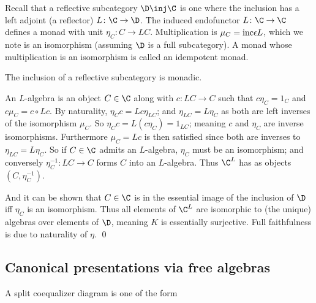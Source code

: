 \edefn

Recall that a reflective subcategory $\D\inj\C$ is one where the inclusion has a left adjoint (a {\emphcolor reflector}) $L\colon\C\to\D$.
The induced endofunctor $L\colon\C\to\C$ defines a monad with unit $\eta_C\colon C\to LC$.
Multiplication is $\mu_C={\rm inc}\epsilon L$, which we note is an isomorphism (assuming $\D$ is a full subcategory).
A monad whose multiplication is an isomorphism is called an {\emphcolor idempotent monad}.

\bprop

    The inclusion of a reflective subcategory is monadic.

\eprop

\bproof

    An $L$-algebra is an object $C\in\C$ along with $c\colon LC\to C$ such that $c\eta_C=1_C$ and $c\mu_C=c\circ Lc$.
    By naturality, $\eta_Cc=Lc\eta_{LC}$; and $\eta_{LC}=L\eta_C$ as both are left inverses of the isomorphism $\mu_C$.
    So $\eta_Cc=L(c\eta_C)=1_{LC}$; meaning $c$ and $\eta_C$ are inverse isomorphisms.
    Furthermore $\mu_C=Lc$ is then satisfied since both are inverses to $\eta_{LC}=L\eta_C$.
    So if $C\in\C$ admits an $L$-algebra, $\eta_C$ must be an isomorphism; and conversely $\eta_C^{-1}\colon LC\to C$ forms $C$ into an $L$-algebra.
    Thus $\C^L$ has as objects $(C,\eta_C^{-1})$.

    And it can be shown that $C\in\C$ is in the essential image of the inclusion of $\D$ iff $\eta_C$ is an isomorphism.
    Thus all elements of $\C^L$ are isomorphic to (the unique) algebras over elements of $\D$, meaning $K$ is essentially surjective.
    Full faithfulness is due to naturality of $\eta$.
    \qed

\eproof

\subsection{Canonical presentations via free algebras}

\bdefn

    A {\emphcolor split coequalizer} diagram is one of the form

    \medskip
    \centerline{}
    \bigskip

